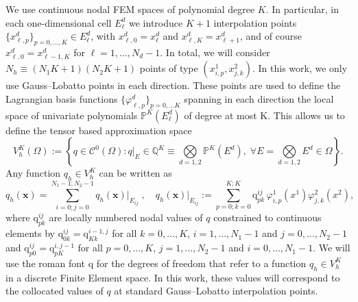 \documentclass[a4paper,10pt]{article}
\newcommand{\dx}{0pt}  %
\newcommand{\dy}{3pt}  %
\renewcommand{\dx}{0pt}
\renewcommand{\dy}{0pt}
\begin{document}
We use continuous nodal FEM spaces of polynomial degree $K$. In particular, 
in each one-dimensional cell $ E^{d}_\ell$ we introduce $K+1$ interpolation points
$\{x^{d}_{\ell,p}\}_{p=0,\dots,K} \in E^{d}_\ell$, with $x^d_{\ell,0} = x^d_{\ell}$ and $x^d_{\ell,K} = x^d_{\ell+1}$,
and  of course $x^{d}_{\ell,0} = x^{d}_{\ell-1,K}$ for $\ell=1,\dots,N_d-1$. In total, we will consider $N_h \equiv (N_1K+1)(N_2K+1)$ points of type $(x^1_{i,p},x^2_{j,k})$.
In this work, we only use  Gauss--Lobatto points in each direction. 
These points are used to define the Lagrangian basis functions $\{\varphi^d_{\ell,p}\}_{{p=0,\dots K}} $ spanning in each direction the local 
space of univariate polynomials $ \mathbb P^K(E^d_\ell)$ of degree at most K.  This allows us to define the tensor based approximation space 
\begin{equation}\label{eq:Vh}
		V^K_h(\Omega):=%
		\left\lbrace q \in \mathcal{C}^0(\Omega): q|_E\in \mathbb Q^K\equiv\bigotimes\limits_{d=1,2}\mathbb     P^K(E^{d}),\;\forall E= \bigotimes\limits_{d=1,2}E^{d} \in \Omega\right\rbrace.
\end{equation}
Any function  $q_h \in V^K_h$ can be written as  
\begin{equation}\label{eq:2DFEM_functions}
	q_h(\mathbf{x}) =\sum_{i=0;j=0}^{N_1-1;N_2-1}q_h(\mathbf{x})\big|_{E_{ij}}\;,\quad
	q_h(\mathbf{x})\big|_{E_{ij}} :=  \sum_{p=0;k=0}^{K;K} \mathrm q^{ij}_{pk}\, \varphi^1_{i,p}(x^1)\varphi^2_{j,k}(x^2),
\end{equation}
where $ \mathrm  q^{ij}_{pk}$ are locally numbered nodal values  of $q$ constrained to continuous elements by $\mathrm q_{0k}^{ij} = \mathrm q_{Kk}^{i-1,j}$ for all $k=0,\dots,K$, $i=1,\dots,N_1-1$ and $j=0,\dots,N_2-1$ and $\mathrm q_{p0}^{ij} = \mathrm q_{pK}^{i,j-1}$ for all $p=0,\dots,K$, $j=1,\dots,N_2-1$ and $i=0,\dots,N_1-1$. 
We will use the roman font $\mathrm q$ for the degrees of freedom that refer to a function $q_h \in V^K_h$ in a discrete Finite Element space. 
In this work,  these values will correspond to the collocated values of $q$ at standard Gauss--Lobatto interpolation points. 
\end{document}
